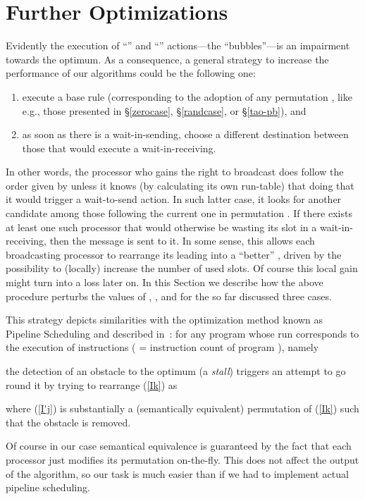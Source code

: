 \documentclass{elsart}
\begin{document}
\section{Further Optimizations}\label{opt}
Evidently the execution of ``'' and ``'' actions---the
``bubbles''---is an impairment towards the optimum.
As a consequence, a general strategy to increase the
performance of our algorithms could be the following one:
\begin{enumerate}
\item execute a base rule (corresponding to the adoption of any
permutation , like e.g., those presented in \S\ref{zerocase},
\S\ref{randcase}, or \S\ref{tao-pb}), and
\item as soon as there is a wait-in-sending, choose a different
destination between those that would execute a wait-in-receiving.
\end{enumerate}

In other words, the processor who gains the right to broadcast
does follow the order given by  unless it knows
(by calculating its own run-table) that doing that it would trigger
a wait-to-send action. In such latter case, it looks for another
candidate among those following the current one in permutation .
If there exists at least one such processor that would otherwise
be wasting its slot in a wait-in-receiving, then the message
is sent to it. In some sense, this allows each 
broadcasting processor to rearrange its leading 
into a ``better'' , driven by the possibility
to (locally) increase the number of used slots. Of course
this local gain might turn into a loss later on. In this
Section we describe how the above procedure perturbs
the values of , , and  for the
so far discussed three cases.

This strategy depicts similarities with the optimization method
known as Pipeline Scheduling and described in~\cite{PaHe96}:
for any program  whose run corresponds to the execution of  instructions
( = instruction count of program ), namely


the detection of an obstacle to the optimum (a \emph{stall\/})
triggers an attempt to go round it by trying to rearrange (\ref{Ik}) as


where (\ref{I'j}) is substantially a (semantically equivalent)
permutation of (\ref{Ik}) such that the obstacle is removed.



Of course in our case semantical equivalence is guaranteed by
the fact that each processor just modifies its permutation on-the-fly. This
does not affect the output of the algorithm, so our task is much easier
than if we had to implement actual pipeline scheduling.
\end{document}
